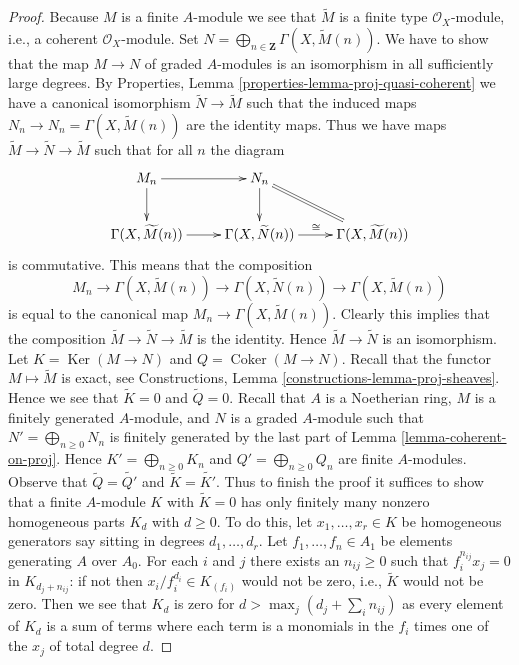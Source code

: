 \documentclass{stacks-project}
\theoremstyle{plain}
\theoremstyle{definition}
\theoremstyle{remark}
\numberwithin{equation}{subsection}
\def\Ker{\mathop{\mathrm{Ker}}}
\def\Coker{\mathop{\mathrm{Coker}}}
\begin{document}
\begin{proof}
Because $M$ is a finite $A$-module we see that
$\widetilde{M}$ is a finite type $\mathcal{O}_X$-module,
i.e., a coherent $\mathcal{O}_X$-module.
Set $N = \bigoplus_{n \in \mathbf{Z}} \Gamma(X, \widetilde{M}(n))$.
We have to show that the map $M \to N$ of graded $A$-modules
is an isomorphism in all sufficiently large degrees.
By Properties, Lemma \ref{properties-lemma-proj-quasi-coherent}
we have a canonical isomorphism $\widetilde{N} \to \widetilde{M}$
such that the induced maps $N_n \to N_n = \Gamma(X, \widetilde{M}(n))$
are the identity maps. Thus we have maps
$\widetilde{M} \to \widetilde{N} \to \widetilde{M}$
such that for all $n$ the diagram
$$
\xymatrix{
M_n \ar[d] \ar[r] & N_n \ar[d] \ar@{=}[rd] \\
\Gamma(X, \widetilde{M}(n)) \ar[r] &
\Gamma(X, \widetilde{N}(n)) \ar[r]^{\cong} &
\Gamma(X, \widetilde{M}(n))
}
$$
is commutative. This means that the composition
$$
M_n \to \Gamma(X, \widetilde{M}(n))
\to \Gamma(X, \widetilde{N}(n)) \to \Gamma(X, \widetilde{M}(n))
$$
is equal to the canonical map $M_n \to \Gamma(X, \widetilde{M}(n))$.
Clearly this implies that the composition
$\widetilde{M} \to \widetilde{N} \to \widetilde{M}$
is the identity. Hence $\widetilde{M} \to \widetilde{N}$ is an isomorphism.
Let $K = \Ker(M \to N)$ and $Q = \Coker(M \to N)$.
Recall that the functor $M \mapsto \widetilde{M}$ is exact, see
Constructions, Lemma \ref{constructions-lemma-proj-sheaves}.
Hence we see that $\widetilde{K} = 0$ and $\widetilde{Q} = 0$.
Recall that $A$ is a Noetherian ring, $M$ is a finitely generated
$A$-module, and $N$ is a graded $A$-module such that
$N' = \bigoplus_{n \geq 0} N_n$ is finitely generated by
the last part of Lemma \ref{lemma-coherent-on-proj}.
Hence $K' = \bigoplus_{n \geq 0} K_n$ and
$Q' = \bigoplus_{n \geq 0} Q_n$ are finite $A$-modules.
Observe that $\widetilde{Q} = \widetilde{Q'}$ and
$\widetilde{K} = \widetilde{K'}$.
Thus to finish the proof it suffices to show
that a finite $A$-module $K$ with $\widetilde{K} = 0$
has only finitely many nonzero homogeneous parts $K_d$ with $d \geq 0$.
To do this, let $x_1, \ldots, x_r \in K$ be homogeneous generators
say sitting in degrees $d_1, \ldots, d_r$.
Let $f_1, \ldots, f_n \in A_1$ be elements generating $A$ over $A_0$.
For each $i$ and $j$ there exists an $n_{ij} \geq 0$ such that
$f_i^{n_{ij}} x_j = 0$ in $K_{d_j + n_{ij}}$: if not then
$x_i/f_i^{d_i} \in K_{(f_i)}$ would not be zero, i.e., $\widetilde{K}$
would not be zero.
Then we see that $K_d$ is zero for $d > \max_j(d_j + \sum_i n_{ij})$
as every element of $K_d$ is a sum of terms where each term is a
monomials in the $f_i$ times one of the $x_j$ of total degree $d$.
\end{proof}
\end{document}
